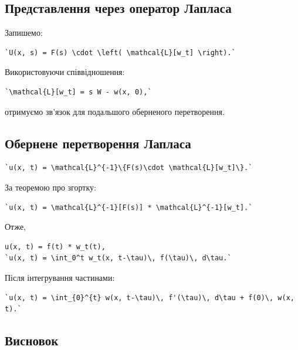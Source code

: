 \documentclass[
  ukrainian,
]{article}
\begin{document}
\subsection{Представлення через оператор
Лапласа}\label{ux43fux440ux435ux434ux441ux442ux430ux432ux43bux435ux43dux43dux44f-ux447ux435ux440ux435ux437-ux43eux43fux435ux440ux430ux442ux43eux440-ux43bux430ux43fux43bux430ux441ux430}

Запишемо:

\begin{verbatim}
`U(x, s) = F(s) \cdot \left( \mathcal{L}[w_t] \right).`
\end{verbatim}

Використовуючи співвідношення:

\begin{verbatim}
`\mathcal{L}[w_t] = s W - w(x, 0),`
\end{verbatim}

отримуємо зв'язок для подальшого оберненого перетворення.

\subsection{Обернене перетворення
Лапласа}\label{ux43eux431ux435ux440ux43dux435ux43dux435-ux43fux435ux440ux435ux442ux432ux43eux440ux435ux43dux43dux44f-ux43bux430ux43fux43bux430ux441ux430}

\begin{verbatim}
`u(x, t) = \mathcal{L}^{-1}\{F(s)\cdot \mathcal{L}[w_t]\}.`
\end{verbatim}

За теоремою про згортку:

\begin{verbatim}
`u(x, t) = \mathcal{L}^{-1}[F(s)] * \mathcal{L}^{-1}[w_t].`
\end{verbatim}

Отже,

\begin{verbatim}
u(x, t) = f(t) * w_t(t),
`u(x, t) = \int_0^t w_t(x, t-\tau)\, f(\tau)\, d\tau.`
\end{verbatim}

Після інтегрування частинами:

\begin{verbatim}
`u(x, t) = \int_{0}^{t} w(x, t-\tau)\, f'(\tau)\, d\tau + f(0)\, w(x, t).`
\end{verbatim}

\subsection{Висновок}\label{ux432ux438ux441ux43dux43eux432ux43eux43a}
\end{document}
